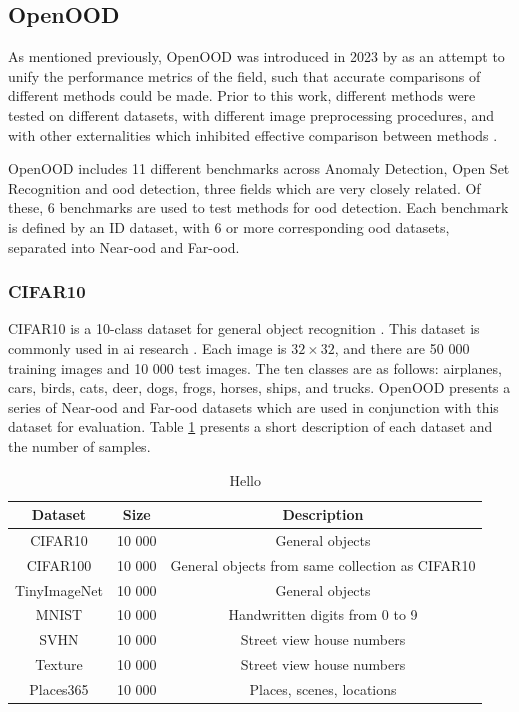 \documentclass[UKenglish]{uiomasterthesis} %
\theoremstyle{definition}
\begin{document}
\subsection{OpenOOD} \label{chapter:openood}

As mentioned previously, OpenOOD was introduced in 2023 by \cite{openood} as an attempt to unify the performance metrics of the field, such that accurate comparisons of different methods could be made. Prior to this work, different methods were tested on different datasets, with different image preprocessing procedures, and with other externalities which inhibited effective comparison between methods \cite{openood}.

OpenOOD includes 11 different benchmarks across Anomaly Detection, Open Set Recognition and \ac{ood} detection, three fields which are very closely related. Of these, 6 benchmarks are used to test methods for \ac{ood} detection. Each benchmark is defined by an ID dataset, with 6 or more corresponding \ac{ood} datasets, separated into Near-\ac{ood} and Far-\ac{ood}.

\subsubsection{CIFAR10}

CIFAR10 \cite{cifar} is a 10-class dataset for general object recognition \cite{openood}. This dataset is commonly used in \ac{ai} research \cite{pouyanfar2018survey}. Each image is $32 \times 32$, and there are 50 000 training images and 10 000 test images. The ten classes are as follows: airplanes, cars, birds, cats, deer, dogs, frogs, horses, ships, and trucks. OpenOOD presents a series of Near-\ac{ood} and Far-\ac{ood} datasets which are used in conjunction with this dataset for evaluation. Table \ref{table:cifar10} presents a short description of each dataset and the number of samples.

\begin{table}
\begin{center}
\begin{tabular}{ |c|c|c| } 
    \hline
    Dataset & Size & Description \\
    \hline
    \rowcolor{id!50}
    CIFAR10 & 10 000 & General objects \\ 
    \hline
    \rowcolor{near!50}
    CIFAR100 & 10 000 & General objects from same collection as CIFAR10 \\ 
    \rowcolor{near!50}
    TinyImageNet & 10 000 & General objects \\ 
    \hline
    \rowcolor{far!50}
    MNIST & 10 000 & Handwritten digits from 0 to 9 \\ 
    \rowcolor{far!50}
    SVHN & 10 000 & Street view house numbers \\ 
    \rowcolor{far!50}
    Texture & 10 000 & Street view house numbers \\ 
    \rowcolor{far!50}
    Places365 & 10 000 & Places, scenes, locations \\ 
    \hline
    \end{tabular}
    \caption{Hello}
    \label{table:cifar10}
\end{center}
\end{table}
\end{document}

